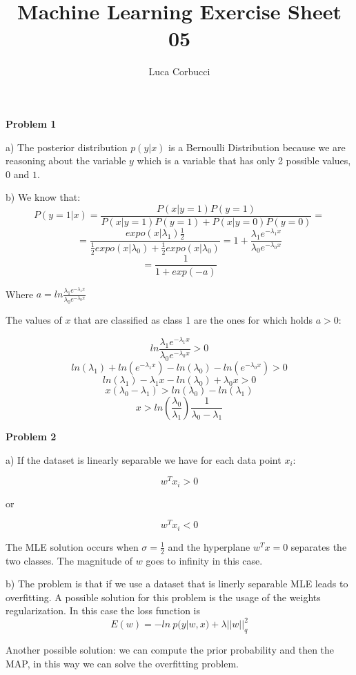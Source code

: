 \documentclass{article}
\author{Luca Corbucci}
\title{Machine Learning Exercise Sheet 05}
\begin{document}
\maketitle

\textbf{Problem 1}
\newline

a) The posterior distribution $p(y|x)$ is a Bernoulli Distribution because we are reasoning about the variable $y$ which is a variable that has only 2 possible values, $0$ and $1$.

b) We know that: $$P(y=1|x) = \frac{P(x|y=1)P(y=1)}{P(x|y=1)P(y=1) + P(x|y=0)P(y=0)} =$$ 
$$ = \frac{expo(x|\lambda_1)\frac{1}{2}}{\frac{1}{2}expo(x|\lambda_0) + \frac{1}{2}expo(x|\lambda_0)} = 1 + \frac{\lambda_1e^{-\lambda_1x}}{\lambda_0e^{-\lambda_0x}}$$ $$=\frac{1}{1+exp(-a)}$$

Where $a=ln\frac{\lambda_1e^{-\lambda_1x}}{\lambda_0e^{-\lambda_0x}}$

The values of $x$ that are classified as class 1 are the ones for which holds $a>0$:

$$ln\frac{\lambda_1e^{-\lambda_1x}}{\lambda_0e^{-\lambda_0x}} > 0$$
$$ln(\lambda_1) + ln(e^{-\lambda_1x}) - ln(\lambda_0) - ln(e^{-\lambda_0x}) > 0$$
$$ln(\lambda_1) - \lambda_1x - ln(\lambda_0) + \lambda_0x > 0$$
$$x(\lambda_0 - \lambda_1) > ln(\lambda_0) - ln(\lambda_1)$$
$$x>ln(\frac{\lambda_0}{\lambda_1})\frac{1}{\lambda_0-\lambda_1}$$
\newline

\textbf{Problem 2}
\newline

a) If the dataset is linearly separable we have for each data point $x_i$:

$$w^Tx_i > 0$$

or 

$$w^Tx_i < 0$$

The MLE solution occurs when $\sigma = \frac{1}{2}$ and the hyperplane $w^Tx = 0$ separates the two classes.
The magnitude of $w$ goes to infinity in this case.

b) The problem is that if we use a dataset that is linerly separable MLE leads to overfitting.
A possible solution for this problem is the usage of the weights regularization.
In this case the loss function is $$E(w) = -ln \ p(y|w,x)+\lambda	 ||w||^2_q$$

Another possible solution: we can compute the prior probability and then the MAP, in this way we can solve the overfitting problem.
\newline
\end{document}

